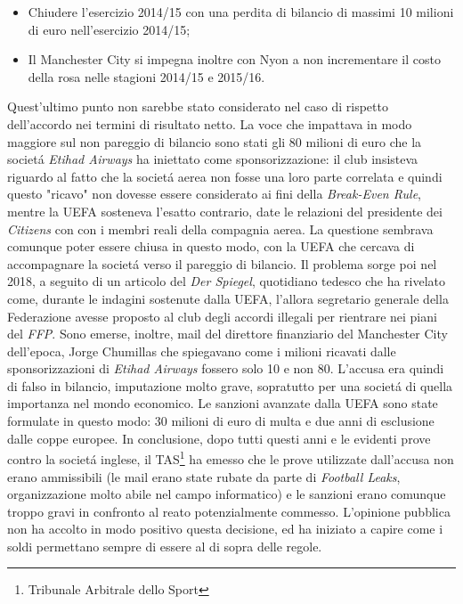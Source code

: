 \documentclass[
    corpo=12pt,
    oneside,
    evenboxes,
    tipotesi=triennale,
    stile=classica,
    oldstyle,
    autoretitolo,
    greek,
]{toptesi}
\begin{document}
\begin{interlinea}{1.5}
\begin{itemize}
    \item Chiudere l’esercizio 2014/15 con una perdita di bilancio di massimi 10 milioni di euro nell’esercizio 2014/15;
    \item Il Manchester City si impegna inoltre con Nyon a non incrementare il costo della rosa nelle stagioni 2014/15 e 2015/16.
\end{itemize}
Quest'ultimo punto non sarebbe stato considerato nel caso di rispetto dell'accordo nei termini di risultato netto. \newline
La voce che impattava in modo maggiore sul non pareggio di bilancio sono stati gli 80 milioni di euro che la societ\'a \emph{Etihad Airways}
ha iniettato come sponsorizzazione: il club insisteva riguardo al fatto che la societ\'a aerea non fosse una loro parte correlata e quindi questo
"ricavo" non dovesse essere considerato ai fini della \emph{Break-Even Rule}, mentre la UEFA sosteneva l'esatto contrario, date le 
relazioni del presidente dei \emph{Citizens} con con i membri reali della compagnia aerea. 
La questione sembrava comunque poter essere chiusa in questo modo, con la UEFA che cercava di accompagnare la societ\'a verso il 
pareggio di bilancio. Il problema sorge poi nel 2018, a seguito di un articolo del \emph{Der Spiegel}, quotidiano tedesco che ha rivelato come,
durante le indagini sostenute dalla UEFA, l'allora segretario generale della Federazione avesse proposto al club degli accordi illegali per
rientrare nei piani del \emph{FFP}. Sono emerse, inoltre, mail del direttore finanziario del Manchester
City dell'epoca, Jorge Chumillas che spiegavano come i milioni ricavati dalle sponsorizzazioni di \emph{Etihad Airways} fossero solo 10 e non 80.
L'accusa era quindi di falso in bilancio, imputazione molto grave, sopratutto per una societ\'a di quella importanza nel mondo economico. Le 
sanzioni avanzate dalla UEFA sono state formulate in questo modo: 30 milioni di euro di multa e due anni di esclusione dalle coppe europee.
In conclusione, dopo tutti questi anni e le evidenti prove contro la societ\'a inglese, il TAS\footnote{Tribunale Arbitrale dello Sport} ha 
emesso che le prove utilizzate dall'accusa non erano ammissibili (le mail erano state rubate da parte di \emph{Football Leaks}, organizzazione molto
abile nel campo informatico) e le sanzioni erano comunque troppo gravi in confronto al reato potenzialmente commesso. L'opinione pubblica
non ha accolto in modo positivo questa decisione, ed ha iniziato a capire come i soldi permettano sempre di essere al di sopra delle
regole.\newline

\end{interlinea}
\end{document}

